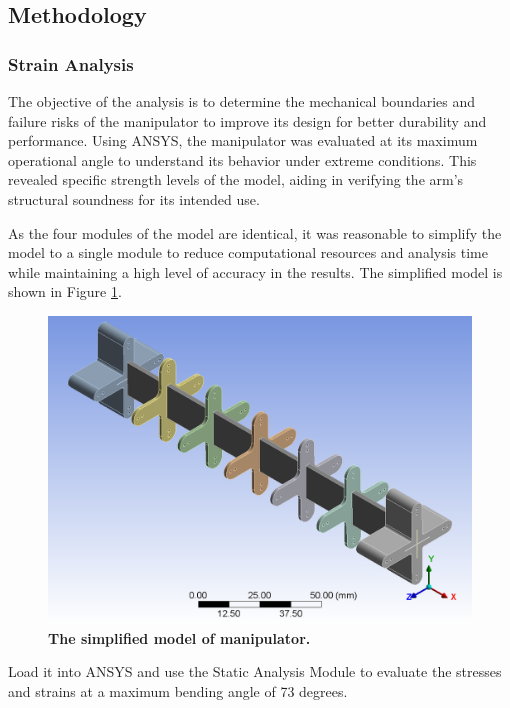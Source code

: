 \subsection{Methodology}
\subsubsection{Strain Analysis}
The objective of the analysis is to determine the mechanical boundaries and failure risks of the manipulator to 
improve its design for better durability and performance. Using ANSYS, the manipulator was evaluated at its maximum 
operational angle to understand its behavior under extreme conditions. This revealed specific strength levels of the 
model, aiding in verifying the arm's structural soundness for its intended use. 

As the four modules of the model are identical, it was reasonable to simplify the model to a single module to 
reduce computational resources and analysis time while maintaining a high level of accuracy in the results. The 
simplified model is shown in Figure \ref{fig:sim_model}.
\begin{figure}[H] %
    \centering
    \captionsetup{labelsep=colon}
    \includegraphics[width=.85\textwidth]{Image/Design/model.png} 
    \caption[The simplified model of manipulator]
    {\centering \textbf{The simplified model of manipulator.}}
    \label{fig:sim_model}
\end{figure}
\noindent Load it into ANSYS and use the Static Analysis Module to evaluate the stresses and strains at a maximum bending 
angle of 73 degrees.


